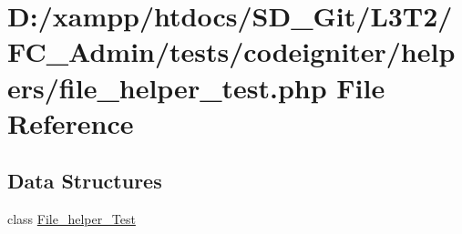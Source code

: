 \hypertarget{file__helper__test_8php}{}\section{D\+:/xampp/htdocs/\+S\+D\+\_\+\+Git/\+L3\+T2/\+F\+C\+\_\+\+Admin/tests/codeigniter/helpers/file\+\_\+helper\+\_\+test.php File Reference}
\label{file__helper__test_8php}
\subsection*{Data Structures}
\begin{DoxyCompactItemize}
\item 
class \hyperlink{class_file__helper___test}{File\+\_\+helper\+\_\+\+Test}
\end{DoxyCompactItemize}
